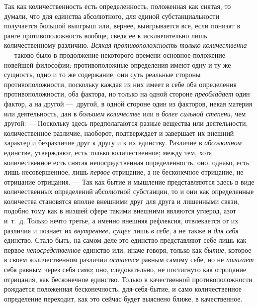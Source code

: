 \label{bkm:bm69a}Так как количественность есть определенность, положенная как снятая, то
думали, что для единства абсолютного, для единой субстанциальности
получается большой выигрыш или, вернее, выигрывается все, если понизят в
ранге противоположность вообще, сведя ее к исключительно лишь
количественному различию. {\em Всякая противоположность
только количественна} —~таково было в продолжение некоторого времени
основное положение новейшей
философии; противоположные
определения имеют одну и ту же сущность, одно и то же содержание, они суть
реальные стороны противоположности, поскольку каждая из них имеет в себе
оба определения противоположности, оба фактора, но только на одной стороне
{\em преобладает} один фактор, а на другой —~другой, в
одной стороне один из факторов, некая материя или деятельность, дан в
{\em большем количестве} или в
{\em более сильной степени}, чем другой. — Поскольку
здесь предполагаются разные вещества или деятельности, количественное
различие, наоборот, подтверждает и завершает их внешний характер и
безразличие друг к другу и к их единству. Различие в
{\em абсолютном} единстве, утверждают, есть только
количественное; между тем, хотя количественное есть снятая непосредственная
определенность, оно, однако, есть лишь несовершенное, лишь
{\em первое} отрицание, а не бесконечное отрицание, не
отрицание отрицания. — Так как бытие и мышление представляются здесь в виде
количественных определений абсолютной субстанции, то и они как определенные
количества становятся вполне внешними друг для друга и лишенными связи,
подобно тому как в низшей сфере такими внешними являются углерод, азот
и~т.~д. Только нечто третье, а именно внешняя рефлексия, отвлекается от их
различия и познает их {\em внутреннее, сущее} лишь
{\em в себе}, а не также и {\em для
себя} единство. Стало быть, на самом деле это единство представляют себе
лишь как первое {\em непосредственное} единство или,
иначе говоря, только как {\em бытие}, которое в своем
количественном различии {\em остается} равным самому
себе, но не {\em полагает} себя равным через себя само;
оно, следовательно, не постигнуто как отрицание отрицания, как бесконечное
единство. Только в качественной противоположности рождается положенная
бесконечность, для-себя-бытие, и само количественное определение переходит,
как это сейчас будет выяснено ближе, в качественное.

\bigskip


